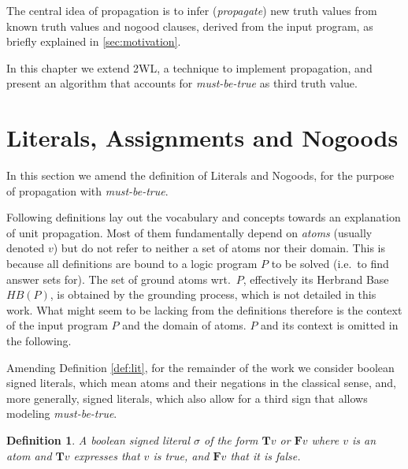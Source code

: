 \documentclass{vutinfth} %
\newtheorem{definition}{Definition}[section]
\newcommand{\mbt}{must-be-true\xspace}
\newcommand{\bT}{\mathbf{T}}
\newcommand{\bF}{\mathbf{F}}
\newcommand{\bsgl}{\sigma}
\begin{document}
The central idea of propagation is to infer (\emph{propagate}) new truth values from known truth values and nogood clauses, derived from the input program, as briefly explained in \ref{sec:motivation}. 

In this chapter we extend 2WL, a technique to implement propagation, and present an algorithm that accounts for \emph{\mbt} as third truth value.

\section{Literals, Assignments and Nogoods}


In this section we amend the definition of Literals and Nogoods, for the purpose of propagation with \emph{\mbt}.

Following definitions lay out the vocabulary and concepts towards an explanation of unit propagation. Most of them fundamentally depend on \emph{atoms} (usually denoted $v$) but do not refer to neither a set of atoms nor their domain. This is because all definitions are bound to a logic program $P$ to be solved (i.e.~to find answer sets for). The set of ground atoms wrt.~$P$, effectively its Herbrand Base $\textit{HB}(P)$, is obtained by the grounding process, which is not detailed in this work. What might seem to be lacking from the definitions therefore is the context of the input program $P$ and the domain of atoms. $P$ and its context is omitted in the following.



Amending Definition \ref{def:lit}, for the remainder of the work we consider boolean signed literals, which mean atoms and their negations in the classical sense, and, more generally, signed literals, which also allow for a third sign that allows modeling \emph{\mbt}.

\begin{definition}
A \emph{boolean signed literal} $\bsgl$ of the form $\bT v$ or $\bF v$ where $v$ is an atom and $\bT v$ expresses that $v$ is \emph{true}, and $\bF v$ that it is \emph{false}.
\end{definition}
\end{document}
